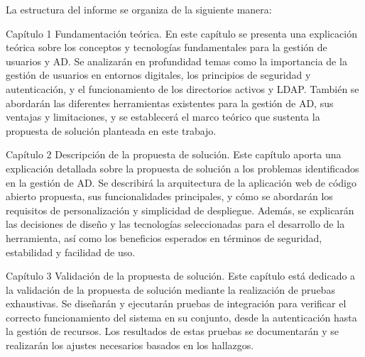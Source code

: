 
La estructura del informe se organiza de la siguiente manera:

Capítulo 1 Fundamentación teórica. En este capítulo se presenta una explicación teórica sobre los conceptos y tecnologías fundamentales para la gestión de usuarios y AD. Se analizarán en profundidad temas como la importancia de la gestión de usuarios en entornos digitales, los principios de seguridad y autenticación, y el funcionamiento de los directorios activos y LDAP. También se abordarán las diferentes herramientas existentes para la gestión de AD, sus ventajas y limitaciones, y se establecerá el marco teórico que sustenta la propuesta de solución planteada en este trabajo.

Capítulo 2 Descripción de la propuesta de solución. Este capítulo aporta una explicación detallada sobre la propuesta de solución a los problemas identificados en la gestión de AD. Se describirá la arquitectura de la aplicación web de código abierto propuesta, sus funcionalidades principales, y cómo se abordarán los requisitos de personalización y simplicidad de despliegue. Además, se explicarán las decisiones de diseño y las tecnologías seleccionadas para el desarrollo de la herramienta, así como los beneficios esperados en términos de seguridad, estabilidad y facilidad de uso.

Capítulo 3 Validación de la propuesta de solución. Este capítulo está dedicado a la validación de la propuesta de solución mediante la realización de pruebas exhaustivas. Se diseñarán y ejecutarán pruebas de integración para verificar el correcto funcionamiento del sistema en su conjunto, desde la autenticación hasta la gestión de recursos. Los resultados de estas pruebas se documentarán y se realizarán los ajustes necesarios basados en los hallazgos.

